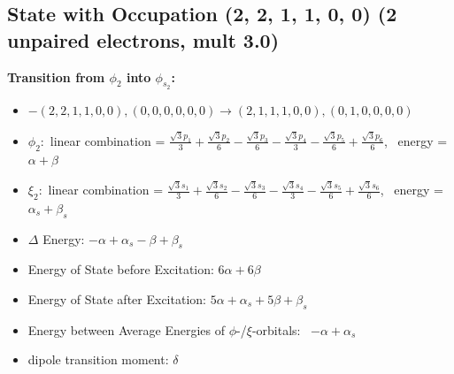 \documentclass[12pt,a4paper]{article}
\begin{document}
\subsection*{State with Occupation (2, 2, 1, 1, 0, 0) (2 unpaired electrons, mult 3.0)}
        \noindent\textbf{Transition from $\phi_{2}$ into $\phi_{s_{2}}$:}
        \begin{itemize}
            \item $- (2, 2, 1, 1, 0, 0), (0, 0, 0, 0, 0, 0) \rightarrow (2, 1, 1, 1, 0, 0), (0, 1, 0, 0, 0, 0)$
        
            \item $\phi_{2}:$ linear combination = $\frac{\sqrt{3} p_{1}}{3} + \frac{\sqrt{3} p_{2}}{6} - \frac{\sqrt{3} p_{3}}{6} - \frac{\sqrt{3} p_{4}}{3} - \frac{\sqrt{3} p_{5}}{6} + \frac{\sqrt{3} p_{6}}{6}$, \
            energy = $\alpha + \beta$
            
            \item $\xi_{2}:$ linear combination = $\frac{\sqrt{3} s_{1}}{3} + \frac{\sqrt{3} s_{2}}{6} - \frac{\sqrt{3} s_{3}}{6} - \frac{\sqrt{3} s_{4}}{3} - \frac{\sqrt{3} s_{5}}{6} + \frac{\sqrt{3} s_{6}}{6}$, \
            energy = $\alpha_{s} + \beta_{s}$
            
            \item $\Delta$ Energy: $- \alpha + \alpha_{s} - \beta + \beta_{s}$
            \item Energy of State before Excitation: $6 \alpha + 6 \beta$
            \item Energy of State after Excitation: $5 \alpha + \alpha_{s} + 5 \beta + \beta_{s}$
            \item Energy between Average Energies of $\phi$-/$\xi$-orbitals: \
            $- \alpha + \alpha_{s}$
        
            \item dipole transition moment: $\delta$
        
        \end{itemize}
        
\end{document}
